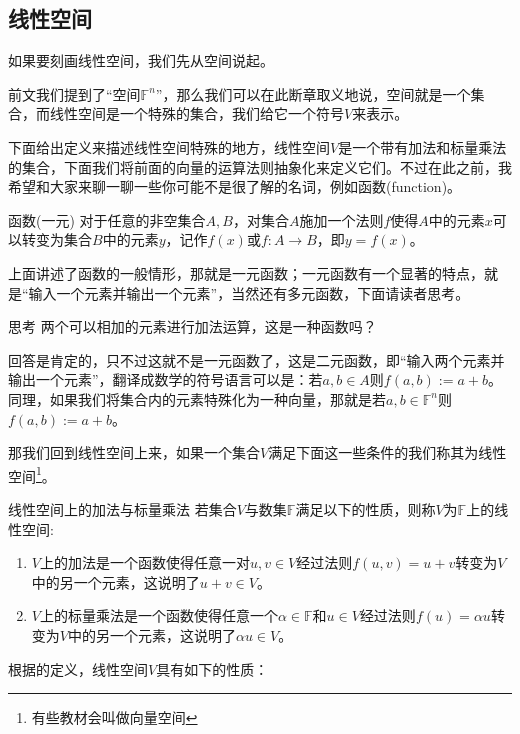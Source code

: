 \subsection{线性空间}
\label{subsec:linearSpace}
如果要刻画线性空间，我们先从空间说起。

前文我们提到了``空间$\mathbb{F}^n$''，那么我们可以在此断章取义地说，空间就是一个集合，而线性空间是一个特殊的集合，我们给它一个符号$V$来表示。

下面给出定义来描述线性空间特殊的地方，线性空间$V$是一个带有加法和标量乘法的集合，下面我们将前面的向量的运算法则抽象化来定义它们。不过在此之前，我希望和大家来聊一聊一些你可能不是很了解的名词，例如函数(function)。
\begin{definition}{函数(一元)}
	对于任意的非空集合$A,B$，对集合$A$施加一个法则$f$使得$A$中的元素$x$可以转变为集合$B$中的元素$y$，记作$f(x)$或$f: A\rightarrow B$，即$y=f(x)$。
\end{definition}

上面讲述了函数的一般情形，那就是一元函数；一元函数有一个显著的特点，就是``输入一个元素并输出一个元素''，当然还有多元函数，下面请读者思考。

\begin{ascolorbox1}{思考}
	两个可以相加的元素进行加法运算，这是一种函数吗？
\end{ascolorbox1}

回答是肯定的，只不过这就不是一元函数了，这是二元函数，即``输入两个元素并输出一个元素''，翻译成数学的符号语言可以是：若$a,b\in A$则$f(a,b):=a+b$。同理，如果我们将集合内的元素特殊化为一种向量，那就是若$a,b\in \mathbb{F}^n$则$f(a,b):=a+b$。

那我们回到线性空间上来，如果一个集合$V$满足下面这一些条件的我们称其为线性空间\footnote{有些教材会叫做向量空间}。

\begin{definition}{线性空间上的加法与标量乘法}
	若集合$V$与数集$\mathbb{F}$满足以下的性质，则称$V$为$\mathbb{F}$上的线性空间:
	\begin{enumerate}
		\item $V$上的加法是一个函数使得任意一对$u,v \in V$经过法则$f(u,v)=u+v$转变为$V$中的另一个元素，这说明了$u+v\in V$。
		\item $V$上的标量乘法是一个函数使得任意一个$\alpha \in \mathbb{F}$和$u\in V$经过法则$f(u)=\alpha u$转变为$V$中的另一个元素，这说明了$\alpha u \in V$。
	\end{enumerate}
\end{definition}

根据的定义，线性空间$V$具有如下的性质：

